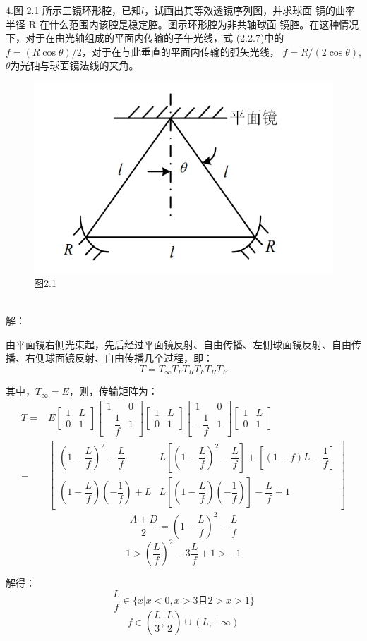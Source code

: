 \documentclass[12pt]{article}
\begin{document}
{\fangsong
4.图 2.1 所示三镜环形腔，已知$l$，试画出其等效透镜序列图，并求球面
镜的曲率半径 R 在什么范围内该腔是稳定腔。图示环形腔为非共轴球面
镜腔。在这种情况下，对于在由光轴组成的平面内传输的子午光线，式
(2.2.7)中的 $f=(R\cos\theta)/{2}$，对于在与此垂直的平面内传输的弧矢光线，
$f=R/(2\cos\theta)$,$\theta$为光轴与球面镜法线的夹角。
}
\begin{figure}[H]
	\centering
	\includegraphics[width=0.5\linewidth]{fig/4_new.png}
	\caption*{图2.1}%
\end{figure}
{\kaishu\noindent
\\解：
\par 由平面镜右侧光束起，先后经过平面镜反射、自由传播、左侧球面镜反射、自由传播、右侧球面镜反射、自由传播几个过程，即：
\[
	T=T_{\infty}T_FT_RT_FT_RT_F
\]
\par 其中，$T_{\infty}=E$，则，传输矩阵为：
\begin{align*}
	T=&
	E
	\begin{bmatrix}
		1 & L \\
		0 & 1
	\end{bmatrix}
	\begin{bmatrix}
		1 & 0 \\
		-\dfrac{1}{f}  & 1
	\end{bmatrix}
	\begin{bmatrix}
		1 & L \\
		0 & 1
	\end{bmatrix}
	\begin{bmatrix}
		1 & 0 \\
		-\dfrac{1}{f}  & 1
	\end{bmatrix}
	\begin{bmatrix}
		1 & L \\
		0 & 1
	\end{bmatrix}
	\\=&
	\begin{bmatrix}
		\left(  1-\dfrac{L}{f}\right)^2 -\dfrac{L}{f} & L \left[ \left( 1-\dfrac{L}{f}  \right)^2-\dfrac{L}{f}   \right] + \left[ \left( 1-f \right) L-\dfrac{1}{f}  \right] \\
		\left( 1-\dfrac{L}{f}  \right)  \left( -\dfrac{1}{f}  \right)+L & L \left[  	\left( 1-\dfrac{L}{f}  \right)  \left( -\dfrac{1}{f}  \right) \right] -\dfrac{L}{f} + 1
	\end{bmatrix}
\end{align*}
\[
	\dfrac{A+D}{2} = \left( 1-\dfrac{L}{f}  \right) ^2-\dfrac{L}{f} 
\]
\[
	1 > \left( \dfrac{L}{f}  \right) ^2 -3 \dfrac{L}{f} +1 > -1	
\]
\par 解得：
\[
	\frac{L}{f} \in \{ x|x<0,x>3\text{且}2>x>1 \}
\]
\[
	f\in \left( \frac{L}{3} ,\frac{L}{2}  \right) \cup	\left( L,+\infty \right) 
\]
\\}
\end{document}

